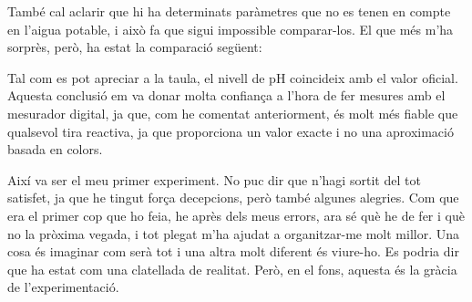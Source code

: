També cal aclarir que hi ha determinats paràmetres que no es tenen en compte en l’aigua potable, i això fa que sigui impossible comparar-los. El que més m’ha sorprès, però, ha estat la comparació següent:

\begin{table}[H]
\centering
\caption{Comparació entre els valors experimentals i els oficials de l'aigua de l'aixeta (amb el mesurador de pH)}
\label{tab:comparacio_aigua_sense_sol}
\end{table}

Tal com es pot apreciar a la taula, el nivell de pH coincideix amb el valor oficial. Aquesta conclusió em va donar molta confiança a l’hora de fer mesures amb el mesurador digital, ja que, com he comentat anteriorment, és molt més fiable que qualsevol tira reactiva, ja que proporciona un valor exacte i no una aproximació basada en colors.

Així va ser el meu primer experiment. No puc dir que n’hagi sortit del tot satisfet, ja que he tingut força decepcions, però també algunes alegries. Com que era el primer cop que ho feia, he après dels meus errors, ara sé què he de fer i què no la pròxima vegada, i tot plegat m’ha ajudat a organitzar-me molt millor. Una cosa és imaginar com serà tot i una altra molt diferent és viure-ho. Es podria dir que ha estat com una clatellada de realitat. Però, en el fons, aquesta és la gràcia de l’experimentació.

